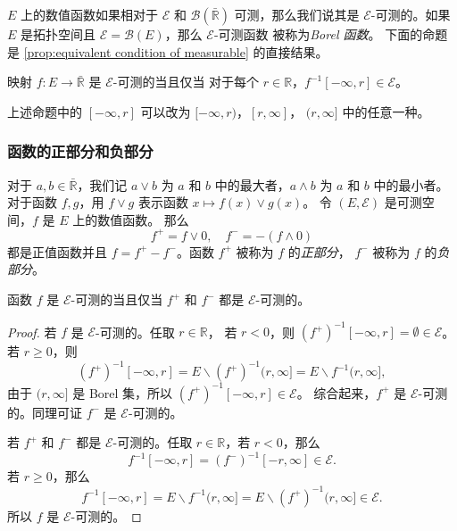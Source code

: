 \documentclass[fontset=none]{Notes}
\begin{document}
$E$ 上的数值函数如果相对于 $\mathcal{E}$ 和 $\mathcal{B}(\bar{\mathbb{R}})$
可测，那么我们说其是 $\mathcal{E}$-可测的。如果 $E$
是拓扑空间且 $\mathcal{E}=\mathcal{B}(E)$，那么 $\mathcal{E}$-可测函数
被称为\emph{Borel 函数}。
下面的命题是 \autoref{prop:equivalent condition of measurable} 的直接结果。

\begin{proposition}
  映射 $f:E\to\bar{\mathbb{R}}$ 是 $\mathcal{E}$-可测的当且仅当
  对于每个 $r\in \mathbb{R}$，$f^{-1}[-\infty,r]\in \mathcal{E}$。
\end{proposition}

上述命题中的 $[-\infty,r]$ 可以改为 $[-\infty,r)$，$[r,\infty]$，
$(r,\infty]$ 中的任意一种。

\subsubsection{函数的正部分和负部分}

对于 $a,b\in\bar{\mathbb{R}}$，我们记 $a\vee b$ 为 $a$ 和 $b$
中的最大者，$a\wedge b$ 为 $a$ 和 $b$ 中的最小者。
对于函数 $f,g$，用 $f\vee g$ 表示函数 $x\mapsto f(x)\vee g(x)$。
令 $(E,\mathcal{E})$ 是可测空间，$f$ 是 $E$ 上的数值函数。
那么
\[
  f^+=f\vee 0,\quad f^-=-(f\wedge 0)  
\]
都是正值函数并且 $f=f^+-f^-$。函数 $f^+$ 被称为 $f$ 的\emph{正部分}，
$f^-$ 被称为 $f$ 的\emph{负部分}。

\begin{proposition}
  函数 $f$ 是 $\mathcal{E}$-可测的当且仅当 $f^+$ 和 $f^-$
  都是 $\mathcal{E}$-可测的。
\end{proposition}
\begin{proof}
  若 $f$ 是 $\mathcal{E}$-可测的。任取 $r\in \mathbb{R}$，
若 $r< 0$，则 $\left(f^+\right)^{-1}[-\infty,r]=\emptyset\in \mathcal{E}$。
  若 $r\geq 0$，则
  \[
    \left(f^+\right)^{-1}[-\infty,r]=E \smallsetminus \left(f^+\right)^{-1}(r,\infty]
    =E \smallsetminus f^{-1}(r,\infty],
  \]
  由于 $(r,\infty]$ 是 Borel 集，所以 $\left(f^+\right)^{-1}[-\infty,r]\in \mathcal{E}$。
  综合起来，$f^+$ 是 $\mathcal{E}$-可测的。同理可证 $f^-$ 是 $\mathcal{E}$-可测的。

  若 $f^+$ 和 $f^-$ 都是 $\mathcal{E}$-可测的。任取 $r\in \mathbb{R}$，若 $r<0$，那么
  \[
    f^{-1}[-\infty,r]=  \left(f^-\right)^{-1}[-r,\infty]\in \mathcal{E}.
  \]
  若 $r\geq 0$，那么
  \[
    f^{-1}[-\infty,r]= E \smallsetminus f^{-1}(r,\infty]
    =E \smallsetminus \left(f^+\right)^{-1}(r,\infty]\in \mathcal{E}.
  \]
  所以 $f$ 是 $\mathcal{E}$-可测的。
\end{proof}
\end{document}
